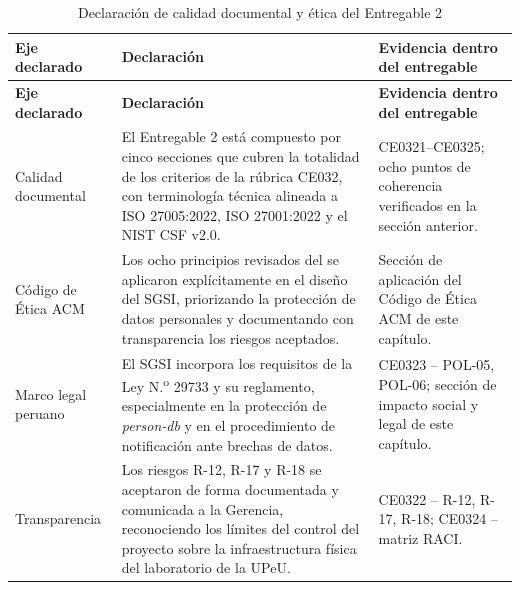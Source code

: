 \documentclass[11pt, a4paper, oneside]{report}
\begin{document}
\renewcommand{\arraystretch}{1.3}
\footnotesize
{}

\begin{xltabular}{\textwidth}{@{}|L{3.2cm}|X|X|@{}}
\caption{Declaración de calidad documental y ética del Entregable 2}
\label{tab:declaracion_calidad_etica_e2} \\

\parbox[c][1.1cm][c]{\linewidth}{\centering\color{white}\bfseries\small Eje declarado} &
\parbox[c][1.1cm][c]{\linewidth}{\centering\color{white}\bfseries\small Declaración} &
\parbox[c][1.1cm][c]{\linewidth}{\centering\color{white}\bfseries\small Evidencia dentro del entregable} \\ \hline
\endfirsthead

\parbox[c][1.1cm][c]{\linewidth}{\centering\color{white}\bfseries\small Eje declarado} &
\parbox[c][1.1cm][c]{\linewidth}{\centering\color{white}\bfseries\small Declaración} &
\parbox[c][1.1cm][c]{\linewidth}{\centering\color{white}\bfseries\small Evidencia dentro del entregable} \\ \hline
\endhead

\hline
\endfoot

{\small Calidad documental} & {\small El Entregable 2 está compuesto por cinco secciones que cubren la totalidad de los criterios de la rúbrica CE032, con terminología técnica alineada a ISO 27005:2022, ISO 27001:2022 y el NIST CSF v2.0.} & {\small CE0321--CE0325; ocho puntos de coherencia verificados en la sección anterior.} \\ \hline

{\small Código de Ética ACM} & {\small Los ocho principios revisados del \citet{acmcode} se aplicaron explícitamente en el diseño del SGSI, priorizando la protección de datos personales y documentando con transparencia los riesgos aceptados.} & {\small Sección de aplicación del Código de Ética ACM de este capítulo.} \\ \hline

{\small Marco legal peruano} & {\small El SGSI incorpora los requisitos de la Ley N.\textsuperscript{o} 29733 y su reglamento, especialmente en la protección de \textit{person-db} y en el procedimiento de notificación ante brechas de datos.} & {\small CE0323 -- POL-05, POL-06; sección de impacto social y legal de este capítulo.} \\ \hline

{\small Transparencia} & {\small Los riesgos R-12, R-17 y R-18 se aceptaron de forma documentada y comunicada a la Gerencia, reconociendo los límites del control del proyecto sobre la infraestructura física del laboratorio de la UPeU.} & {\small CE0322 -- R-12, R-17, R-18; CE0324 -- matriz RACI.} \\ \hline

\end{xltabular}
\end{document}

